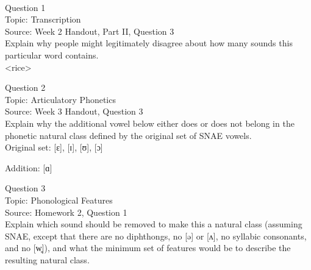 \documentclass[12pt]{article}
\begin{document}
\newpage

\begin{center}
\textbf{{\color{red}{\HUGE END OF EXAM}}}\\

\end{center}
\newpage

\begin{center}
\textbf{{\color{blue}{\HUGE START OF EXAM\\}}}

\textbf{{\color{blue}{\HUGE Student ID: 30263\\}}}

\textbf{{\color{blue}{\HUGE \\}}}

\end{center}
\newpage

{\large Question 1}\\

Topic: Transcription\\
Source: Week 2 Handout, Part II, Question 3\\

Explain why people might legitimately disagree about how many sounds this particular word contains.\\

<rice>


\newpage

{\large Question 2}\\

Topic: Articulatory Phonetics\\
Source: Week 3 Handout, Question 3\\

Explain why the additional vowel below either does or does not belong in the phonetic natural class defined by the original set of SNAE vowels.\\

Original set: {[ɛ]}, {[ɪ]}, {[ʊ]}, {[ɔ]}

Addition: {[ɑ]}


\newpage

{\large Question 3}\\

Topic: Phonological Features\\
Source: Homework 2, Question 1\\

Explain which sound should be removed to make this a natural class (assuming SNAE, except that there are no diphthongs, no [ə] or [ʌ], no syllabic consonants, and no [w̥]), and what the minimum set of features would be to describe the resulting natural class.\\
\end{document}
